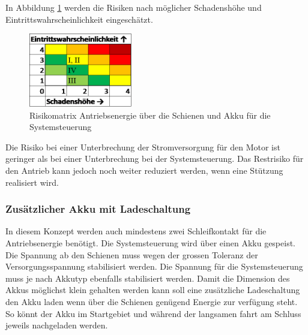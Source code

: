 \documentclass[../../main.tex]{subfiles}
\begin{document}
    In Abbildung \ref{fig:strom_risikomatrix_akku} werden die Risiken nach möglicher Schadenshöhe und Eintrittswahrscheinlichkeit eingeschätzt.

    \begin{figure}[H]
        \centering
        \includegraphics[width=0.4\textwidth]{Strom_Risiko_Akku.png}
        \caption {Risikomatrix Antriebsenergie über die Schienen und Akku für die Systemsteuerung}
        \label{fig:strom_risikomatrix_akku}
    \end{figure}

    Die Risiko bei einer Unterbrechung der Stromversorgung für den Motor ist geringer als bei einer Unterbrechung bei der Systemsteuerung. Das Restrisiko für den Antrieb kann jedoch noch weiter reduziert werden, wenn eine Stützung realisiert wird.


    \subsubsection{Zusätzlicher Akku mit Ladeschaltung}
    In diesem Konzept werden auch mindestens zwei Schleifkontakt für die Antriebsenergie benötigt. Die Systemsteuerung wird über einen Akku gespeist. Die Spannung ab den Schienen muss wegen der grossen Toleranz der Versorgungsspannung stabilisiert werden. Die Spannung für die Systemsteuerung muss je nach Akkutyp ebenfalls stabilisiert werden.
    Damit die Dimension des Akkus möglichst klein gehalten werden kann soll eine zusätzliche Ladeschaltung den Akku laden wenn über die Schienen genügend Energie zur verfügung steht. So könnt der Akku im Startgebiet und während der langsamen fahrt am Schluss jeweils nachgeladen werden.
\end{document}
